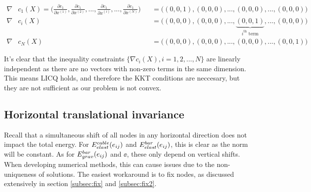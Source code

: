 \begin{align*}
    \nabla &c_1(X) = \bigg( \frac{\partial c_1}{\partial x^{(1)}},\frac{\partial c_1}{\partial x^{(2)}},...,\frac{\partial c_1}{\partial x^{(i)}},...,\frac{\partial c_1}{\partial x^{(N)}} \bigg) &&=\bigg( (0,0,1),(0,0,0),...,(0,0,0),...,(0,0,0) \bigg) \\
    \nabla &c_i(X) &&= \bigg( (0,0,0),(0,0,0),...,\underbrace{(0,0,1)}_{i^{\text{th}}\text{ term}},...,(0,0,0) \bigg)\\
    \nabla &c_N(X) &&=\bigg( (0,0,0),(0,0,0),...,(0,0,0),...,(0,0,1) \bigg)
\end{align*}

It's clear that the inequality constraints $\{\nabla c_i(X),i=1,2,...,N\}$ are linearly independent as there are no vectors with non-zero terms in the same dimension. This means LICQ holds, and therefore the KKT conditions are neccesary, but they are not sufficient as our problem is not convex.

\subsection{Horizontal translational invariance}\label{sec:invariance}
Recall that a simultaneous shift of all nodes in any horizontal direction does not impact the total energy. For $E^{cable}_{elast}(e_{ij})$ and $E^{bar}_{elast}(e_{ij})$, this is clear as the norm will be constant. As for $E^{bar}_{grav}(e_{ij})$ and $\ee$, these only depend on vertical shifts. When developing numerical methods, this can cause issues due to the non-uniqueness of solutions. The easiest workaround is to fix nodes, as discussed extensively in section \ref{subsec:fix} and \ref{subsec:fix2}.

